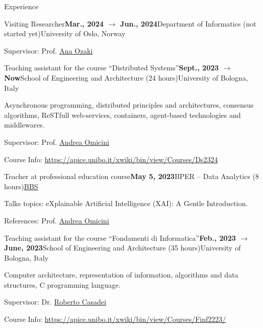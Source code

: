 \documentclass{resume} %
\begin{document}
    \begin{rSection}{Experience}
        
        \begin{rSubsection}{Visiting Researcher}{\textbf{Mar., 2024 $\rightarrow$ Jun., 2024}}{Department of Informatics (not started yet)}{University of Oslo, Norway}
            \item Supervisor: Prof. \href{mailto:anaoz@ifi.uio.no}{Ana Ozaki}
        \end{rSubsection}

        \begin{rSubsection}{Teaching assistant for the course ``Distributed Systems''}{\textbf{Sept., 2023 $\rightarrow$ Now}}{School of Engineering and Architecture (24 hours)}{University of Bologna, Italy}
            \item Asynchronous programming, distributed principles and architectures, consensus algorithms, ReSTfull web-services, containers, agent-based technologies and middlewares.
            \item Supervisor: Prof. \href{mailto:andrea.omicini@unibo.it}{Andrea Omicini}
            \item Course Info: \url{https://apice.unibo.it/xwiki/bin/view/Courses/Ds2324}
        \end{rSubsection}
        
        \begin{rSubsection}{Teacher at professional education course}{\textbf{May 5, 2023}}{BPER -- Data Analytics (8 hours)}{\href{https://www.bbs.unibo.eu/}{BBS}}
            \item Talks topics: eXplainable Artificial Intelligence (XAI): A Gentle Introduction.
            \item References:  Prof. \href{mailto:andrea.omicini@unibo.it}{Andrea Omicini}
        \end{rSubsection}
        
        \begin{rSubsection}{Teaching assistant for the course ``Fondamenti di Informatica''}{\textbf{Feb., 2023 $\rightarrow$ June, 2023}}{School of Engineering and Architecture (35 hours)}{University of Bologna, Italy}
            \item Computer architecture, representation of information, algorithms and data structures, C programming language.
            \item Supervisor: Dr. \href{mailto:roberto.casadei@unibo.it}{Roberto Casadei}
            \item Course Info: \url{https://apice.unibo.it/xwiki/bin/view/Courses/Finf2223/}
        \end{rSubsection}
        

\end{rSection}
\end{document}
